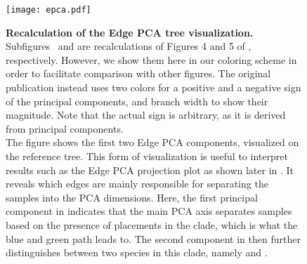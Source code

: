 \begin{figure}[hpbt]
    \centering
    \vspace*{1em}
    \texttt{[image: epca.pdf]}
    \vspace*{-1em}
    \begin{subfigure}{0pt}
        \label{fig:epca:sub:comp1}
    \end{subfigure}
    \begin{subfigure}{0pt}
        \label{fig:epca:sub:comp2}
    \end{subfigure}
    \caption[Recalculation of the Edge PCA tree visualization]{
        \textbf{Recalculation of the Edge PCA tree visualization.}
        Subfigures~ and  are recalculations
        of Figures 4 and 5 of \cite{Matsen2011a}, respectively.
        However, we show them here in our coloring scheme in order to facilitate comparison with other figures.
        The original publication instead uses two colors for a positive and a negative sign of the principal components,
        and branch width to show their magnitude.
        Note that the actual sign is arbitrary, as it is derived from principal components.
        \\
        The figure shows the first two Edge PCA components, visualized on the reference tree.
        This form of visualization is useful to interpret results such as the Edge PCA projection plot
        as shown later in .
        It reveals which edges are mainly responsible for separating the samples into the PCA dimensions.
        Here, the first principal component in  indicates that the main PCA axis
        separates samples based on the presence of placements in the  clade,
        which is what the blue and green path leads to.
        The second component in  then further distinguishes between two species
        in this clade, namely  and .
    }
    \label{fig:epca}
\end{figure}



